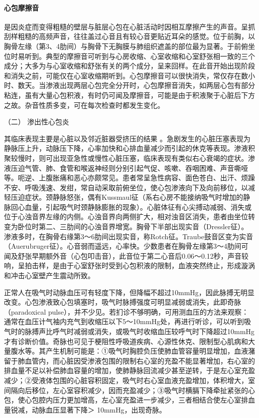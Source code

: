 \paragraph{心包摩擦音}

是因炎症而变得粗糙的壁层与脏层心包在心脏活动时因相互摩擦产生的声音。呈抓刮样粗糙的高频声音，往往盖过心音且有较心音更贴近耳朵的感觉。位于前胸，以胸骨左缘（第3、4肋间）与胸骨下无胸膜与肺组织遮盖的部位最为显著。于前俯坐位时易听到。典型的摩擦音可听到与心房收缩、心室收缩和心室舒张相一致的三个成分；大多为与心室收缩和舒张有关的两个成分，呈来回样。在此音开始出现阶段和消失之前，可能仅在心室收缩期听到。心包摩擦音可以很快消失，常仅存在数小时、数天。当渗液出现两层心包完全分开时，心包摩擦音消失，如两层心包有部分粘连，虽有大量心包积液，有时仍可闻及摩擦音，可能是由于积液聚于心脏后下方之故。杂音性质多变，可在每次检查时都发生变化。

\hypertarget{text00302.htmlux5cux23CHP10-4-2-1-2}{}
（二） 渗出性心包炎

其临床表现主要是心脏以及邻近脏器受挤压的结果
。急剧发生的心脏压塞表现为静脉压上升，动脉压下降，心率加快和心排血量减少而引起的休克等表现。渗液积聚较慢时，则可出现亚急性或慢性心脏压塞，临床表现有类似右心衰竭的症状。渗液压迫气管、肺、食管和喉返神经则分别引起气促、咳嗽、吞咽困难、声音嘶哑等。呃逆、上腹胀痛和恶心亦颇常见。患者常呈急性病容、面色苍白、出汗、烦躁不安、呼吸浅速、发绀，常自动采取前俯坐位，使心包渗液向下及向前移位，以减轻压迫症状。颈静脉怒张，偶有Kussmaul征（系右心房不能接纳吸气时增加的静脉回心血量，引起吸气时颈静脉膨胀的现象）。心脏体征有心尖搏动减弱、消失或位于心浊音界左缘的内侧。心浊音界向两侧扩大，相对浊音区消失，患者由坐位转变为卧位时第二、三肋间的心浊音界增宽。胸骨下半部出现实音（Dressler征）。渗液多时，在胸骨右缘第3～6肋间出现实音，称Rotch征。Traube鼓音区变为实音（Auerubruger征）。心音弱而遥远，心率快。少数患者在胸骨左缘第3～4肋间可闻及舒张早期额外音（心包叩击音），此音位于第二心音后0.06～0.12秒，声音较响，呈拍击样，是由于心室舒张时受到心包积液的限制，血液突然终止，形成漩涡和冲击心室壁产生震动所致。

正常人在吸气时动脉血压可有轻度下降，但降幅不超过10mmHg，因此脉搏无明显改变。心包渗液致心包填塞时，吸气时脉搏强度可明显减弱或消失，此即奇脉（paradoxical
pulse），并不少见。若扪诊不够明确，可用测血压的方法来观察：通常在血压计气袖内充气到收缩压以下5～10mmHg处，再进行听诊，可以听到吸气时的脉搏声比呼气时减弱或消失，或吸气时收缩血压较呼气时下降超过10mmHg才有诊断价值。奇脉也可见于梗阻性呼吸道疾病、心源性休克、限制型心肌病和大量腹水等。其产生机制可能是：①吸气时胸腔负压使肺血管容量明显增加，血液潴留于肺血管内，而心脏因受渗液包围的限制右心室的充盈不能显著增加，右心室的排血量不足以补偿肺血容量的增加，使肺静脉回流减少甚至逆转，于是左心室充盈减少；②受液体包围的心脏容积固定，吸气时右心室血液充盈增加，体积增大，室间隔向后移位，左心室容积减少，因而充盈减少；③吸气时横膈下降牵扯紧张的心包，使心包腔内压力更加增高，左心室充盈进一步减少，三者相结合使左心室排血量锐减，动脉血压显著下降＞
10mmHg，出现奇脉。

